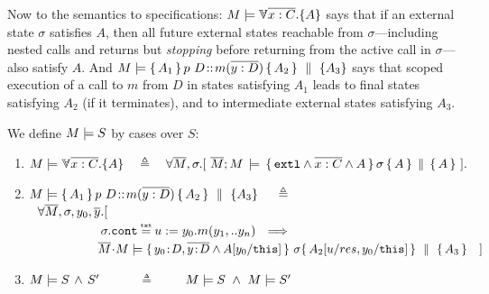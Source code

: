 {Now to the} semantics to specifications:  %
 $\satisfies{M}{\TwoStatesN {\overline {x:C}} {A}}$ 
says that if an external state $\sigma$ satisfies $A$, then all future external states reachable from $\sigma$—including nested %
 calls and returns but  {\emph{stopping} before}   returning from the active call in $\sigma$—%
also satisfy $A$. 
 And  $\satisfies{M} { \mprepostN {A_1}{p\ D}{m}{y}{D}{A_2} {A_3} }$ says that scoped execution of a call to $m$ from $D$   in  states satisfying $A_1$ leads to final states satisfying $A_2$ (if it terminates),
 and to intermediate external states satisfying $A_3$.

\begin{definition}  
We define $M \models {S}$ by cases over $S$: %

\label{def:necessity-semantics}

\begin{enumerate}
 \item
 $\satisfies{M}{\TwoStatesN {\overline {x:C}} {A}} \ \  \ \triangleq   \ \ \ {\forall   \Mtwo,  \sigma.[\ {\satAssertQuadruple  \Mtwo  M    {\extThis \wedge \overline {x:C} \wedge A} \sigma {A} {A} }\ ].}$
  \item
 $\satisfies{M} { \mprepostN {A_1}{p\ D}{m}{y}{D}{A_2} {A_3} }\  \ \ \   \triangleq  $ \\ %
$\strut \ \   \forall   \overline{M},  \sigma, y_0,\overline y.[\ $\\
$\strut  \ \ \   \ \ \ \ \ \ \ \ \   \  \ \ \ \ \sigma.\prg{cont}\txteq {u:=y_0.m(y_1,..y_n)} \ \ \Longrightarrow \ \ $\\
$\strut  \ \ \   \ \ \ \ \ \ \ \ \   \ \ \  \ \ \satisfies  { \Mtwo\!\cdot\! M} {\quadruple  { y_0\!:\!D,{\overline {y\!:\!D}}  \wedge   A[y_0/\prg{this}]}   {\sigma}   {A_2[u/res,y_0/\prg{this}] }  {A_3 } }  \  \ \  ]  $   
 \item
 $M \models S\, \wedge\, S'$\ \ \  \ \ \  $\triangleq$  \  \ \  \   $\satisfies{M}{S}\ \wedge \ \satisfies{M}{S'}$
\end{enumerate}
\end{definition}

